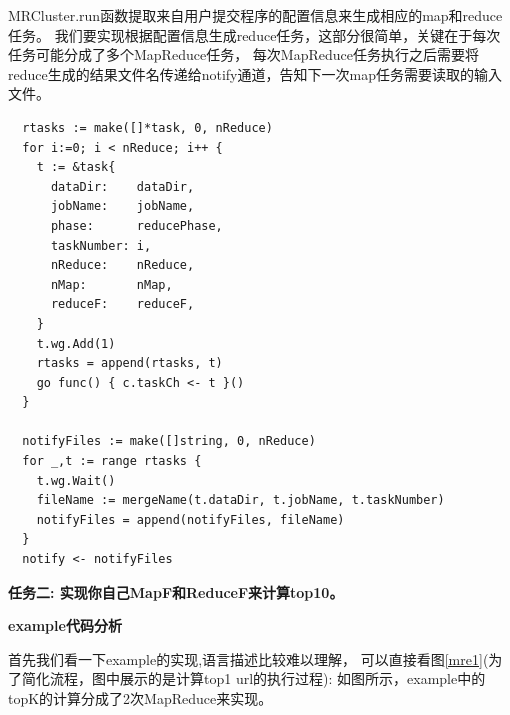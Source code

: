 \documentclass[UTF8]{ctexart}
\begin{document}
MRCluster.run函数提取来自用户提交程序的配置信息来生成相应的map和reduce任务。
我们要实现根据配置信息生成reduce任务，这部分很简单，关键在于每次任务可能分成了多个MapReduce任务，
每次MapReduce任务执行之后需要将reduce生成的结果文件名传递给notify通道，告知下一次map任务需要读取的输入文件。

\begin{lstlisting}
  rtasks := make([]*task, 0, nReduce)
  for i:=0; i < nReduce; i++ {
    t := &task{
      dataDir:    dataDir,
      jobName:    jobName,
      phase:      reducePhase,
      taskNumber: i,
      nReduce:    nReduce,
      nMap:       nMap,
      reduceF:    reduceF,
    }
    t.wg.Add(1)
    rtasks = append(rtasks, t)
    go func() { c.taskCh <- t }()
  }
  
  notifyFiles := make([]string, 0, nReduce)
  for _,t := range rtasks {
    t.wg.Wait()
    fileName := mergeName(t.dataDir, t.jobName, t.taskNumber)
    notifyFiles = append(notifyFiles, fileName)
  }
  notify <- notifyFiles
\end{lstlisting}

\textbf{任务二: 实现你自己MapF和ReduceF来计算top10。}

\textbf{example代码分析}

首先我们看一下example的实现,语言描述比较难以理解，
可以直接看图\ref{mre1}(为了简化流程，图中展示的是计算top1 url的执行过程): 
如图所示，example中的topK的计算分成了2次MapReduce来实现。
\end{document}
